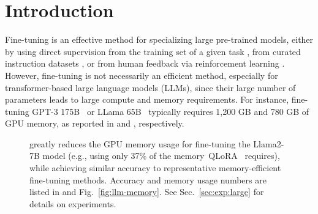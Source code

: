 \section{Introduction}
\label{introduction}

Fine-tuning is an effective method for specializing large pre-trained models, either by using direct supervision from the training set of a given task \citep{ruder_18, devlin_19, raffel_20}, from curated instruction datasets \citep{DBLP:conf/acl/MishraKBH22, wei_22, alpaca}, or from human feedback via reinforcement learning \citep{ouyang_22, bai_22, touvron_23}. 
However, fine-tuning is not necessarily an efficient method,
especially for transformer-based large language models (LLMs),
since their large number of parameters leads to large compute and memory requirements.
For instance, fine-tuning GPT-3 175B~\citep{DBLP:conf/nips/BrownMRSKDNSSAA20} or LLama 65B~\citep{touvron_23} 
typically requires 1,200 GB and 780 GB of GPU memory, as reported in \citet{hu_22} and \citet{dettmers_23}, respectively.

 \begin{figure}[t]
\centering
\caption{\method greatly \mbox{reduces} the GPU memory usage for fine-tuning the \mbox{Llama2-7B} model 
(e.g., using only 37\% of the memory~QLoRA~\citep{dettmers_23} requires),
while achieving similar accuracy to representative memory-efficient fine-tuning methods.
 		Accuracy and memory usage numbers are listed in  and Fig.~\ref{fig:llm-memory}.
 		See Sec.~\ref{sec:exp:large} for details on experiments.
 	}
 	\label{fig:crownjewel}
 \end{figure}


